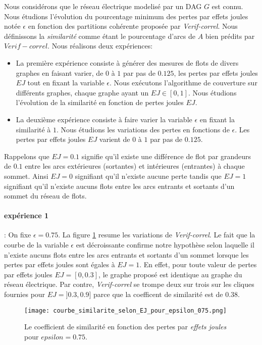 
Nous consid\'erons que le r\'eseau \'electrique modelis\'e par un DAG $G$ est connu.
Nous \'etudions l'\'evolution du pourcentage minimum des pertes par effets joules not\'ee $\epsilon$ en fonction des partitions coh\'erente propos\'ee par  {\em Verif-correl}.
Nous d\'efinissons la {\em similarit\'e} comme \'etant le pourcentage d'arcs de $A$ bien pr\'edits par $Verif-correl$.
Nous r\'ealisons deux exp\'eriences: 
\begin{itemize}
\item La premi\`ere exp\'erience consiste \`a g\'en\'erer des mesures de flots de divers graphes en faisant varier, de $0$ \`a $1$ par pas de $0.125$, les pertes par effets joules $EJ$ tout en fixant la variable $\epsilon$. Nous ex\'ecutons l'algorithme de couverture sur diff\'erents graphes, chaque graphe ayant un $EJ \in [0,1]$. Nous \'etudions l'\'evolution de la  similarit\'e en fonction de pertes joules $EJ$. 

\item La deuxi\`eme exp\'erience consiste \`a faire varier la variable $\epsilon$ en fixant la similarit\'e \`a $1$.  Nous \'etudions les variations des pertes en fonctions de $\epsilon$.  Les pertes par effets joules $EJ$ varient  de $0$ \`a $1$ par pas de $0.125$. 

\end{itemize}
Rappelons que $EJ=0.1$ signifie qu'il existe une diff\'erence de flot par grandeurs de $0.1$ entre les arcs ext\'erieures (sortantes) et int\'erieures (entrantes) \`a chaque sommet. Ainsi $EJ=0$ signifiant qu'il n'existe aucune perte tandis que  $EJ=1$ signifiant qu'il n'existe aucuns flots entre les arcs entrants et sortants d'un sommet du r\'eseau de flots.
\paragraph{exp\'erience 1} :
On fixe  $\epsilon=0.75$. 
La figure \ref{courbeEJCoef} resume les variations de {\em Verif-correl}. 
Le fait que la courbe de la variable $\epsilon$ est d\'ecroissante confirme notre hypoth\`ese selon laquelle il n'existe aucuns flots entre les arcs entrants et sortants d'un sommet lorsque les pertes par effets joules sont \'egales \`a $EJ = 1$. En effet, pour toute valeur de pertes par effets joules  $EJ=[0,0.3]$, le graphe propos\'e est identique au graphe du r\'eseau \'electrique. Par contre, {\em Verif-correl} se trompe deux sur trois sur les cliques fournies pour $EJ = ]0.3,0.9]$ parce que la coefficent de similarit\'e est de $0.38$. 
\begin{figure}
\centering
\texttt{[image: courbe\_similarite\_selon\_EJ\_pour\_epsilon\_075.png]}
\caption{ Le coefficient de similarit\'e en fonction des pertes par {\em effets joules} pour $epsilon=0.75$.}
\label {courbeEJCoef}
\end{figure}
\FloatBarrier

